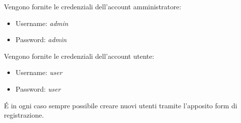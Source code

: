Vengono fornite le credenziali dell’account amministratore:
\begin{itemize}
    \item Username: \textit{admin}
    \item Password: \textit{admin}
\end{itemize}
Vengono fornite le credenziali dell’account utente:
\begin{itemize}
    \item Username: \textit{user}
    \item Password: \textit{user}
\end{itemize}
É in ogni caso sempre possibile creare nuovi utenti tramite l'apposito form di registrazione.
